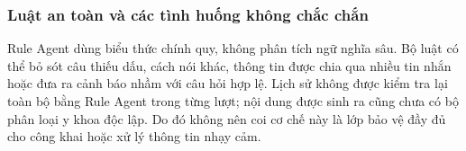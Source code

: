 \subsubsection{Luật an toàn và các tình huống không chắc chắn}
Rule Agent dùng biểu thức chính quy, không phân tích ngữ nghĩa sâu. Bộ luật có thể bỏ sót câu thiếu dấu, cách nói khác, thông tin được chia qua nhiều tin nhắn hoặc đưa ra cảnh báo nhầm với câu hỏi hợp lệ. Lịch sử không được kiểm tra lại toàn bộ bằng Rule Agent trong từng lượt; nội dung được sinh ra cũng chưa có bộ phân loại y khoa độc lập. Do đó không nên coi cơ chế này là lớp bảo vệ đầy đủ cho công khai hoặc xử lý thông tin nhạy cảm.
